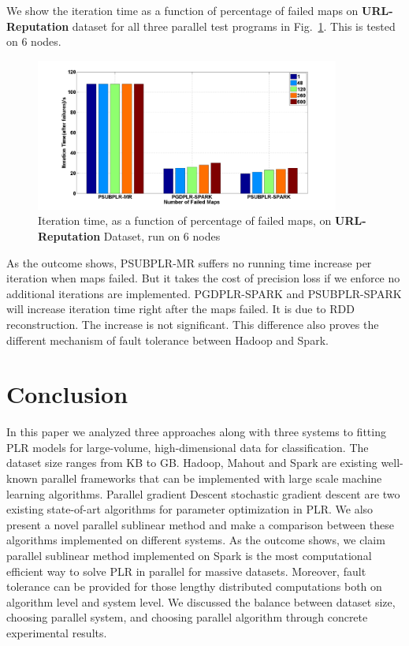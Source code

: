 \documentclass{llncs}
\begin{document}
We show the iteration time as a function of percentage of failed maps on \textbf{URL-Reputation} dataset for all three parallel test programs in Fig.~\ref{fig:14}.
This is tested on 6 nodes.
\begin{figure}[tb] \label{fig:14}
\center \includegraphics[height=5cm,width=10cm]{img/fault_tolerance.png}
\caption{Iteration time, as a function of percentage of failed maps, on \textbf{URL-Reputation} Dataset, run on 6 nodes}
\end{figure}
As the outcome shows, PSUBPLR-MR suffers no running time increase per iteration when maps failed. But it takes the cost of precision loss if we enforce no additional iterations are implemented.
PGDPLR-SPARK and PSUBPLR-SPARK will increase iteration time right after the maps failed. It is due to RDD reconstruction. The increase is not significant.
This difference also proves the different mechanism of fault tolerance between Hadoop and Spark. 

\section{Conclusion} \label{sec:concl}
In this paper we analyzed three approaches along with three systems to fitting PLR models for large-volume, high-dimensional data for classification.
The dataset size ranges from KB to GB.
Hadoop, Mahout and Spark are existing well-known parallel frameworks that can be implemented with large scale machine learning algorithms.
Parallel gradient Descent stochastic gradient descent are two existing state-of-art algorithms for parameter optimization in PLR.
We also present a novel parallel sublinear method and make a comparison between these algorithms implemented on different systems.
As the outcome shows, we claim parallel sublinear method implemented on Spark is the most computational efficient way to solve PLR in parallel for massive datasets.
Moreover, fault tolerance can be provided for those lengthy distributed computations both on algorithm level and system level.
We discussed the balance between dataset size, choosing parallel system, and choosing parallel algorithm through concrete experimental results.

\begin{small}


\end{small}
\end{document}
